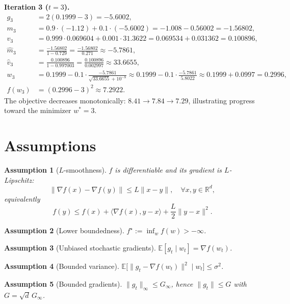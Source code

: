 \documentclass[11pt]{article}
\newtheorem{assumption}{Assumption}
\begin{document}
\noindent\textbf{Iteration 3 ($t=3$).}
\begin{align*}
g_3 &= 2(0.1999-3) = -5.6002,\\
m_3 &= 0.9\cdot(-1.12)+0.1\cdot(-5.6002) = -1.008-0.56002 = -1.56802,\\
v_3 &= 0.999\cdot 0.069604 + 0.001\cdot 31.3622
     = 0.069534 + 0.031362 = 0.100896,\\
\hat m_3 &= \frac{-1.56802}{1-0.729} = \frac{-1.56802}{0.271}\approx -5.7861,\\
\hat v_3 &= \frac{0.100896}{1-0.997003} = \frac{0.100896}{0.002997}\approx 33.6655,\\
w_3 &= 0.1999 - 0.1\cdot\frac{-5.7861}{\sqrt{33.6655}+10^{-8}}
     \approx 0.1999 - 0.1\cdot\frac{-5.7861}{5.8022} \approx 0.1999+0.0997=0.2996,\\
f(w_3) &= (0.2996-3)^2 \approx 7.2922.
\end{align*}
The objective decreases monotonically: $8.41 \to 7.84 \to 7.29$, illustrating progress
toward the minimizer $w^*=3$.

\section*{Assumptions}
\begin{assumption}[$L$-smoothness]\label{a:smooth}
$f$ is differentiable and its gradient is $L$-Lipschitz:
\[
\|\nabla f(x)-\nabla f(y)\| \le L\|x-y\|, \quad \forall x,y\in\mathbb{R}^d,
\]
equivalently
\[
f(y) \le f(x) + \langle \nabla f(x), y-x\rangle + \frac{L}{2}\|y-x\|^2.
\]
\end{assumption}

\begin{assumption}[Lower boundedness]\label{a:lb}
$f^\star := \inf_{w} f(w) > -\infty$.
\end{assumption}

\begin{assumption}[Unbiased stochastic gradients]\label{a:unbiased}
$\mathbb{E}[g_t \mid w_t] = \nabla f(w_t)$.
\end{assumption}

\begin{assumption}[Bounded variance]\label{a:var}
$\mathbb{E}\big[\|g_t-\nabla f(w_t)\|^2 \mid w_t\big] \le \sigma^2$.
\end{assumption}

\begin{assumption}[Bounded gradients]\label{a:bg}
$\|g_t\|_\infty \le G_\infty$, hence $\|g_t\| \le G$ with $G=\sqrt{d}\,G_\infty$.
\end{assumption}
\end{document}
